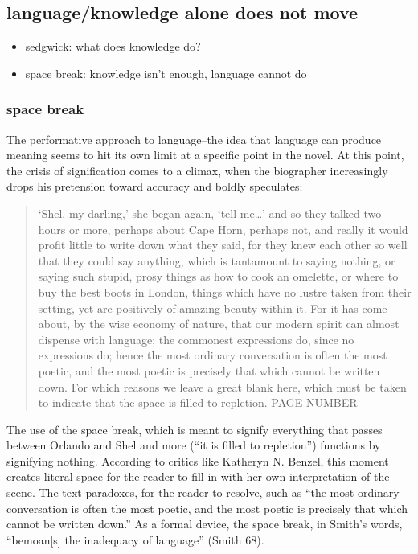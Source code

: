 \documentclass[11pt]{article}
\begin{document}
\subsection{language/knowledge alone does not move}
\label{sec:org18e781f}
\begin{itemize}
\item sedgwick: what does knowledge do?
\item space break: knowledge isn't enough, language cannot do
\end{itemize}
\subsubsection{space break}
\label{sec:orgbfa1881}

The performative approach to language--the idea that language can
produce meaning seems to hit its own limit at a specific point in the
novel. At this point, the crisis of signification comes to a climax,
when the biographer increasingly drops his pretension toward accuracy
and boldly speculates:
\begin{quote}
‘Shel, my darling,’ she began again, ‘tell me…’ and so they talked two
hours or more, perhaps about Cape Horn, perhaps not, and really it
would profit little to write down what they said, for they knew each
other so well that they could say anything, which is tantamount to
saying nothing, or saying such stupid, prosy things as how to cook an
omelette, or where to buy the best boots in London, things which have
no lustre taken from their setting, yet are positively of amazing
beauty within it. For it has come about, by the wise economy of
nature, that our modern spirit can almost dispense with language; the
commonest expressions do, since no expressions do; hence the most
ordinary conversation is often the most poetic, and the most poetic is
precisely that which cannot be written down. For which reasons we
leave a great blank here, which must be taken to indicate that the
space is filled to repletion. PAGE NUMBER
\end{quote}
The use of the space break, which is meant to signify everything that
passes between Orlando and Shel and more (“it is filled to repletion”)
functions by signifying nothing. According to critics like Katheryn
N. Benzel, this moment creates literal space for the reader to fill in
with her own interpretation of the scene. The text paradoxes, for the
reader to resolve, such as “the most ordinary conversation is often
the most poetic, and the most poetic is precisely that which cannot be
written down.” As a formal device, the space break, in Smith’s words,
“bemoan[s] the inadequacy of language” (Smith 68).
\end{document}
